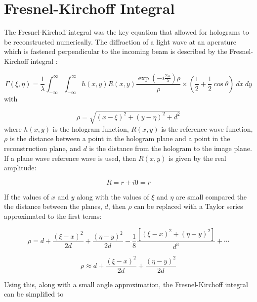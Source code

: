 \section{Fresnel-Kirchoff Integral}

The Fresnel-Kirchoff integral was the key equation that allowed for holograms
to be reconstructed numerically.
The diffraction of a light wave at an aperature which is fastened perpendicular
to the incoming beam is described by the Fresnel-Kirchoff integral
\cite{schnars_digital_2002}:

\begin{equation}
    \Gamma(\xi,\eta) =
    \frac{1}{\lambda}\int_{-\infty}^{\infty}\int_{-\infty}^{\infty}h(x,y)R(x,y)\frac{\exp\left(
        -i\frac{2\pi}{\lambda} \right)\rho}{\rho}\times \left(
        \frac{1}{2}+\frac{1}{2}\cos\theta \right)~dx~dy
        \label{fresnel-kirchoff}
    \end{equation}
    with

    \begin{equation}
        \rho = \sqrt{(x-\xi)^{2}+(y-\eta)^{2}+d^{2}}
    \end{equation}
    where $h(x,y)$ is the hologram function, $R(x,y)$ is the reference wave
    function, $\rho$ is the distance between a point in the hologram plane and
    a point in the reconstruction plane, and $d$ is the distance from the hologram
    to the image plane. If a plane wave reference wave is used,
    then $R(x,y)$ is given by the real amplitude:

    \begin{equation}
        R = r+ i0 = r
    \end{equation}

    If the values of $x$ and $y$ along with the values of $\xi$ and $\eta$ are
    small compared the the distance between the planes, $d$, then $\rho$ can be
    replaced with a Taylor series approximated to the first terms:

    \begin{equation}
        \rho=d+\frac{(\xi-x)^{2}}{2d}+\frac{(\eta-y)^{2}}{2d}-\frac{1}{8}\frac{\left[
        (\xi-x)^{2}+(\eta-y)^{2} \right]}{d^{3}} + \cdots
    \end{equation}

    \begin{equation}
        \rho\approx d+\frac{(\xi-x)^{2}}{2d}+\frac{(\eta-y)^{2}}{2d}
    \end{equation}

    Using this, along with a small angle approximation, the Fresnel-Kirchoff
    integral can be simplified to

